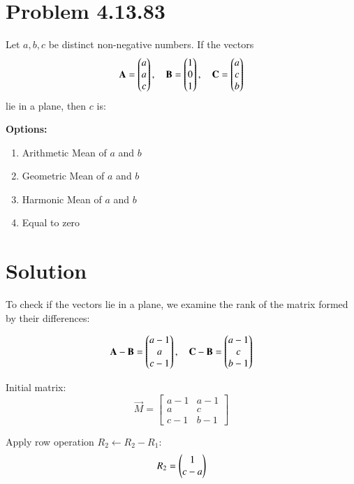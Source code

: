 \documentclass[journal]{IEEEtran}
\begin{document}

\vspace{3cm}

\section*{\large\textbf{Problem 4.13.83}}

Let \( a, b, c \) be distinct non-negative numbers. If the vectors
\[
\mathbf{A} = \begin{pmatrix}a \\ a \\ c\end{pmatrix}, \quad
\mathbf{B} = \begin{pmatrix}1 \\ 0 \\ 1\end{pmatrix}, \quad
\mathbf{C} = \begin{pmatrix}a \\ c \\ b\end{pmatrix}
\]
lie in a plane, then \( c \) is:

\textbf{Options:}
\begin{enumerate}[label=\alph*)]
    \item Arithmetic Mean of \( a \) and \( b \) \vspace{0.2cm}
    \item Geometric Mean of \( a \) and \( b \) \vspace{0.2cm}
    \item Harmonic Mean of \( a \) and \( b \) \vspace{0.2cm}
    \item Equal to zero
\end{enumerate}

\section*{\large\textbf{Solution}}

To check if the vectors lie in a plane, we examine the rank of the matrix formed by their differences:

\[
\mathbf{A} - \mathbf{B} = \begin{pmatrix}a - 1 \\ a \\ c - 1\end{pmatrix}, \quad
\mathbf{C} - \mathbf{B} = \begin{pmatrix}a - 1 \\ c \\ b - 1\end{pmatrix}
\]

Initial matrix:
\[
\vec{M} =
\begin{bmatrix}
a - 1 & a - 1 \\
a     & c     \\
c - 1 & b - 1
\end{bmatrix}
\]

Apply row operation \( R_2 \leftarrow R_2 - R_1 \):
\[
R_2 = \begin{pmatrix}1 \\ c - a\end{pmatrix}
\]
\end{document}
